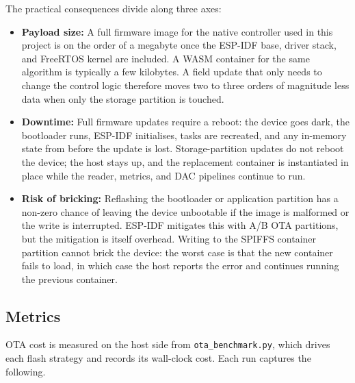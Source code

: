 \documentclass[12pt, a4paper]{report}
\begin{document}
The practical consequences divide along three axes:

\begin{itemize}
  \item \textbf{Payload size:} A full firmware image for the native controller used in this project is on the order of a megabyte once the ESP-IDF base, driver stack, and FreeRTOS kernel are included. A WASM container for the same algorithm is typically a few kilobytes. A field update that only needs to change the control logic therefore moves two to three orders of magnitude less data when only the storage partition is touched.
  \item \textbf{Downtime:} Full firmware updates require a reboot: the device goes dark, the bootloader runs, ESP-IDF initialises, tasks are recreated, and any in-memory state from before the update is lost. Storage-partition updates do not reboot the device; the host stays up, and the replacement container is instantiated in place while the reader, metrics, and DAC pipelines continue to run.
  \item \textbf{Risk of bricking:} Reflashing the bootloader or application partition has a non-zero chance of leaving the device unbootable if the image is malformed or the write is interrupted. ESP-IDF mitigates this with A/B OTA partitions, but the mitigation is itself overhead. Writing to the SPIFFS container partition cannot brick the device: the worst case is that the new container fails to load, in which case the host reports the error and continues running the previous container.
\end{itemize}

\subsection{Metrics}
\label{subsec:containerization-ota-metrics}

OTA cost is measured on the host side from \texttt{ota\_benchmark.py}, which drives each flash strategy and records its wall-clock cost. Each run captures the following.
\end{document}
